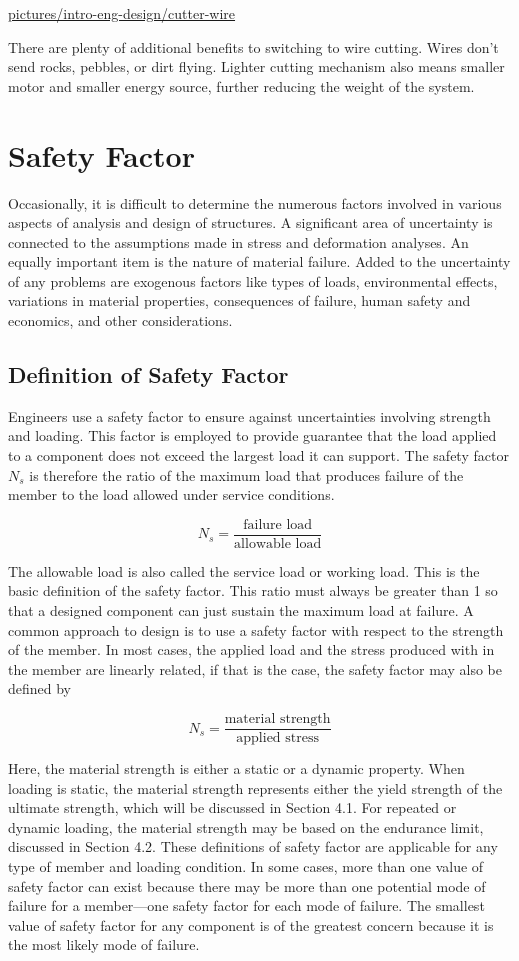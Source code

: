\documentclass[a4paper,openany,12pt]{book}
\begin{document}
\url{pictures/intro-eng-design/cutter-wire}

There are plenty of additional benefits to switching to wire cutting.
Wires don't send rocks, pebbles, or dirt flying. Lighter cutting
mechanism also means smaller motor and smaller energy source, further
reducing the weight of the system.

\section{Safety Factor}
\label{safety-factor}
Occasionally, it is difficult to determine the numerous factors involved
in various aspects of analysis and design of structures. A significant
area of uncertainty is connected to the assumptions made in stress and
deformation analyses. An equally important item is the nature of
material failure. Added to the uncertainty of any problems are exogenous
factors like types of loads, environmental effects, variations in
material properties, consequences of failure, human safety and
economics, and other considerations.

\subsection{Definition of Safety Factor}
\label{definition-of-safety-factor}
Engineers use a safety factor to ensure against uncertainties involving
strength and loading. This factor is employed to provide guarantee that
the load applied to a component does not exceed the largest load it can
support. The safety factor \(N_s\) is therefore the ratio of the maximum
load that produces failure of the member to the load allowed under
service conditions.

$$N_s = \frac{\text{failure load}}{\text{allowable load}}$$

The allowable load is also called the service load or working load. This
is the basic definition of the safety factor. This ratio must always be
greater than 1 so that a designed component can just sustain the maximum
load at failure. A common approach to design is to use a safety factor
with respect to the strength of the member. In most cases, the applied
load and the stress produced with in the member are linearly related, if
that is the case, the safety factor may also be defined by

$$N_s = \frac{\text{material strength}}{\text{applied stress}}$$

Here, the material strength is either a static or a dynamic property.
When loading is static, the material strength represents either the
yield strength of the ultimate strength, which will be discussed in
Section 4.1. For repeated or dynamic loading, the material strength may
be based on the endurance limit, discussed in Section 4.2. These
definitions of safety factor are applicable for any type of member and
loading condition. In some cases, more than one value of safety factor
can exist because there may be more than one potential mode of failure
for a member---one safety factor for each mode of failure. The smallest
value of safety factor for any component is of the greatest concern
because it is the most likely mode of failure.
\end{document}
